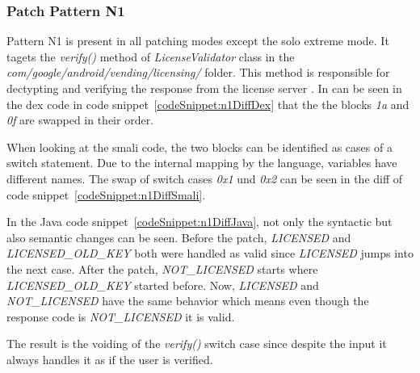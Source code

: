 \subsubsection{Patch Pattern N1}
Pattern N1 is present in all patching modes except the solo extreme mode.
It tagets the \textit{verify()} method of \textit{LicenseValidator} class in the \textit{com/google/android/vending/licensing/} folder.
This method is responsible for dectypting and verifying the response from the license server \cite{developersLicensingReference}.
\newline
In can be seen in the dex code in code snippet~\ref{codeSnippet:n1DiffDex} that the the blocks \textit{1a} and \textit{0f} are swapped in their order.
\newline

When looking at the smali code, the two blocks can be identified as cases of a switch statement.
Due to the internal mapping by the language, variables have different names.
The swap of switch cases \textit{0x1} und \textit{0x2} can be seen in the diff of code snippet~\ref{codeSnippet:n1DiffSmali}.
\newline

In the Java code snippet~\ref{codeSnippet:n1DiffJava}, not only the syntactic but also semantic changes can be seen.
Before the patch, \textit{LICENSED} and \textit{LICENSED\_OLD\_KEY} both were handled as valid since \textit{LICENSED} jumps into the next case.
After the patch, \textit{NOT\_LICENSED} starts where \textit{LICENSED\_OLD\_KEY} started before.
Now, \textit{LICENSED} and \textit{NOT\_LICENSED} have the same behavior which means even though the response code is \textit{NOT\_LICENSED} it is valid.
\newline

The result is the voiding of the \textit{verify()} switch case since despite the input it always handles it as if the user is verified.

